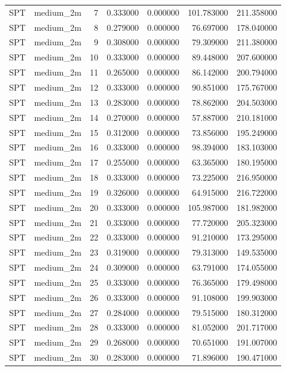 \begin{tabular}{llrrrrr}
SPT & medium_2m & 7 & 0.333000 & 0.000000 & 101.783000 & 211.358000 \\
SPT & medium_2m & 8 & 0.279000 & 0.000000 & 76.697000 & 178.040000 \\
SPT & medium_2m & 9 & 0.308000 & 0.000000 & 79.309000 & 211.380000 \\
SPT & medium_2m & 10 & 0.333000 & 0.000000 & 89.448000 & 207.600000 \\
SPT & medium_2m & 11 & 0.265000 & 0.000000 & 86.142000 & 200.794000 \\
SPT & medium_2m & 12 & 0.333000 & 0.000000 & 90.851000 & 175.767000 \\
SPT & medium_2m & 13 & 0.283000 & 0.000000 & 78.862000 & 204.503000 \\
SPT & medium_2m & 14 & 0.270000 & 0.000000 & 57.887000 & 210.181000 \\
SPT & medium_2m & 15 & 0.312000 & 0.000000 & 73.856000 & 195.249000 \\
SPT & medium_2m & 16 & 0.333000 & 0.000000 & 98.394000 & 183.103000 \\
SPT & medium_2m & 17 & 0.255000 & 0.000000 & 63.365000 & 180.195000 \\
SPT & medium_2m & 18 & 0.333000 & 0.000000 & 73.225000 & 216.950000 \\
SPT & medium_2m & 19 & 0.326000 & 0.000000 & 64.915000 & 216.722000 \\
SPT & medium_2m & 20 & 0.333000 & 0.000000 & 105.987000 & 181.982000 \\
SPT & medium_2m & 21 & 0.333000 & 0.000000 & 77.720000 & 205.323000 \\
SPT & medium_2m & 22 & 0.333000 & 0.000000 & 91.210000 & 173.295000 \\
SPT & medium_2m & 23 & 0.319000 & 0.000000 & 79.313000 & 149.535000 \\
SPT & medium_2m & 24 & 0.309000 & 0.000000 & 63.791000 & 174.055000 \\
SPT & medium_2m & 25 & 0.333000 & 0.000000 & 76.365000 & 179.498000 \\
SPT & medium_2m & 26 & 0.333000 & 0.000000 & 91.108000 & 199.903000 \\
SPT & medium_2m & 27 & 0.284000 & 0.000000 & 79.515000 & 180.312000 \\
SPT & medium_2m & 28 & 0.333000 & 0.000000 & 81.052000 & 201.717000 \\
SPT & medium_2m & 29 & 0.268000 & 0.000000 & 70.651000 & 191.007000 \\
SPT & medium_2m & 30 & 0.283000 & 0.000000 & 71.896000 & 190.471000 \\

\end{tabular}
